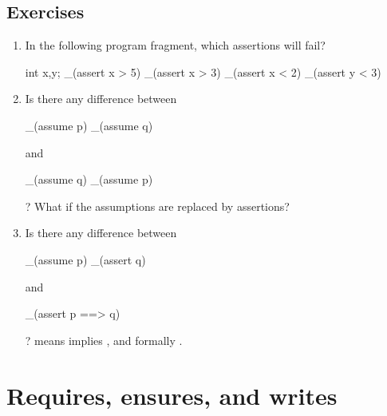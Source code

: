 \subsection*{Exercises}
\begin{enumerate}
\item
In the following program fragment, which assertions will fail?
\begin{VCC}
int x,y; 
_(assert x > 5) 
_(assert x > 3) 
_(assert x < 2) 
_(assert y < 3)
\end{VCC}
\item
Is there any difference between 
\begin{VCC}
_(assume p)
_(assume q)
\end{VCC}
and 
\begin{VCC}
_(assume q) 
_(assume p)
\end{VCC}
? What if the assumptions are replaced by assertions?
\item
Is there any difference between
\begin{VCC}
_(assume p)
_(assert q)
\end{VCC}
and 
\begin{VCC}
_(assert p ==> q)
\end{VCC}
? 
 means  implies , and formally .
\end{enumerate}

\section{Requires, ensures, and writes}
\label{sect:functions}

